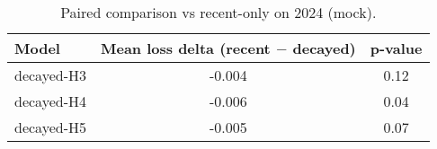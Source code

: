 \begin{table}[t]
  \centering
  \small
  \caption{Paired comparison vs recent-only on 2024 (mock).}
  \begin{tabular}{lcc}
    \toprule
    Model & Mean loss delta (recent $-$ decayed) & p-value \\
    \midrule
    decayed-H3 & -0.004 & 0.12 \\
    decayed-H4 & -0.006 & 0.04 \\
    decayed-H5 & -0.005 & 0.07 \\
    \bottomrule
  \end{tabular}
\end{table}

